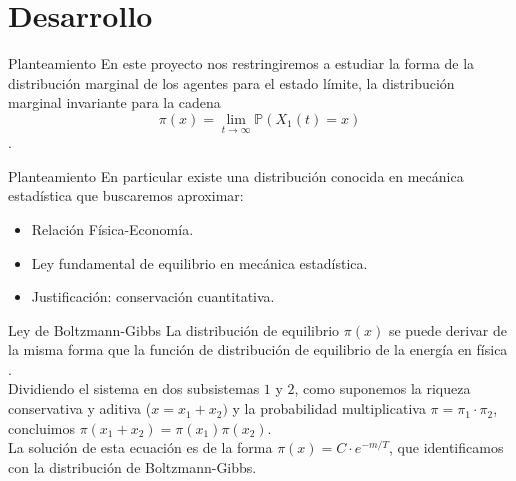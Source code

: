\section{Desarrollo}

\begin{frame}{Planteamiento}
    En este proyecto nos restringiremos a estudiar la forma de la distribución marginal de los agentes para el estado límite, la distribución marginal invariante para la cadena 
    \[
        \pi(x) = \lim\limits_{t\rightarrow\infty}\mathbb{P}(X_{1}(t) = x) 
    \]
    .%
\end{frame}
\begin{frame}{Planteamiento}
    En particular existe una distribución conocida en mecánica estadística que buscaremos aproximar:
    \begin{itemize}
        \item Relación Física-Economía.
        \item Ley fundamental de equilibrio en mecánica estadística.
        \item Justificación: conservación cuantitativa.
    \end{itemize}
\end{frame}
\begin{frame}{Ley de Boltzmann-Gibbs}
    La distribución de equilibrio $\pi(x)$ se puede derivar de la misma forma que la función de distribución de equilibrio de la energía  en física \cite{Wannier}. \\
    Dividiendo el sistema en dos subsistemas $1$ y $2$, como suponemos la riqueza conservativa y aditiva ($x = x_{1}+ x_{2})$ y la probabilidad multiplicativa $\pi = \pi_{1}\cdot \pi_{2}$, concluimos $\pi(x_{1} + x_{2}) =\pi(x_{1})\pi(x_{2}).$\\
    La solución de esta ecuación es de la forma $\pi(x) = C\cdot e^{-m/T}$, que identificamos con la distribución de Boltzmann-Gibbs.
\end{frame}

